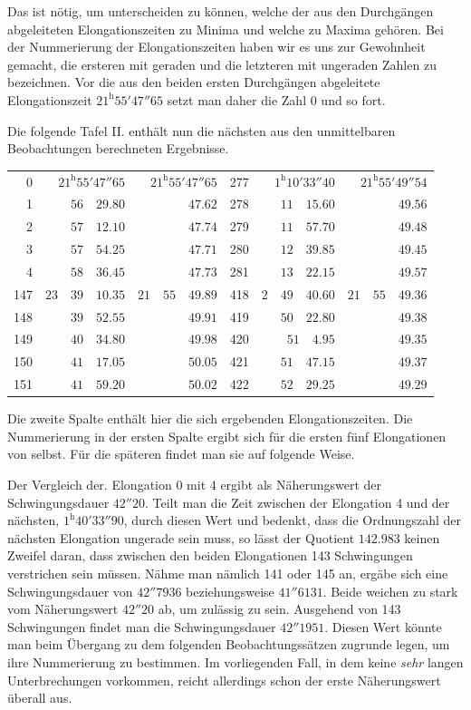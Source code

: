 Das ist nötig, um unterscheiden zu können, welche der aus den Durchgängen abgeleiteten Elongationszeiten zu Minima und welche zu Maxima gehören. Bei der Nummerierung der Elongationszeiten haben wir es uns zur Gewohnheit gemacht, die ersteren mit geraden und die letzteren mit ungeraden Zahlen zu bezeichnen. Vor die aus den beiden ersten Durchgängen abgeleitete Elongationszeit $21^{\mathrm{h}}55'47''65$ setzt man daher die Zahl 0 und so fort.

Die folgende Tafel II. enthält nun die nächsten aus den unmittelbaren Beobachtungen berechneten Ergebnisse.
\begin{center}
\begingroup\fontsize{9}{11}\selectfont\setlength{\tabcolsep}{4pt}
\begin{tabular}{r|r|r||r|r|r}
0 & $21^{\mathrm{h}}55'47''65$ & $21^{\mathrm{h}}55'47''65$ & 277 & $1^{\mathrm{h}}10'33''40$ & $21^{\mathrm{h}}55'49''54$ \\
1 & $56\quad29.80$ & $47.62$ & 278 & $11\quad15.60$ & $49.56$ \\
2 & $57\quad12.10$ & $47.74$ & 279 & $11\quad57.70$ & $49.48$ \\
3 & $57\quad54.25$ & $47.71$ & 280 & $12\quad39.85$ & $49.45$ \\
4 & $58\quad36.45$ & $47.73$ & 281 & $13\quad22.15$ & $49.57$ \\[7pt]
147 & $23\quad39\quad10.35$ & $21\quad55\quad49.89$ & 418 & $2\quad49\quad40.60$ & $21\quad55\quad49.36$ \\
148 & $39\quad52.55$ & $49.91$ & 419 & $50\quad22.80$ & $49.38$ \\
149 & $40\quad34.80$ & $49.98$ & 420 & $51\quad4.95$ & $49.35$ \\
150 & $41\quad17.05$ & $50.05$ & 421 & $51\quad47.15$ & $49.37$ \\
151 & $41\quad59.20$ & $50.02$ & 422 & $52\quad29.25$ & $49.29$
\end{tabular}\endgroup
\end{center}

Die zweite Spalte enthält hier die sich ergebenden Elongationszeiten. Die Nummerierung in der ersten Spalte ergibt sich für die ersten fünf Elongationen von selbst. Für die späteren findet man sie auf folgende Weise.

Der Vergleich der. Elongation 0 mit 4 ergibt als Näherungswert der Schwingungsdauer $42''20$. Teilt man die Zeit zwischen der Elongation 4 und der nächsten, $1^{\mathrm{h}}40'33''90$, durch diesen Wert und bedenkt, dass die Ordnungszahl der nächsten Elongation ungerade sein muss, so lässt der Quotient $142.983$ keinen Zweifel daran, dass zwischen den beiden Elongationen 143 Schwingungen verstrichen sein müssen. Nähme man nämlich 141 oder 145 an, ergäbe sich eine Schwingungsdauer von $42''7936$ beziehungsweise $41''6131$. Beide weichen zu stark vom Näherungswert $42''20$ ab, um zulässig zu sein. Ausgehend von 143 Schwingungen findet man die Schwingungsdauer $42''1951$. Diesen Wert könnte man beim Übergang zu dem folgenden Beobachtungssätzen zugrunde legen, um ihre Nummerierung zu bestimmen. Im vorliegenden Fall, in dem keine \textit{sehr} langen Unterbrechungen vorkommen, reicht allerdings schon der erste Näherungswert überall aus.

